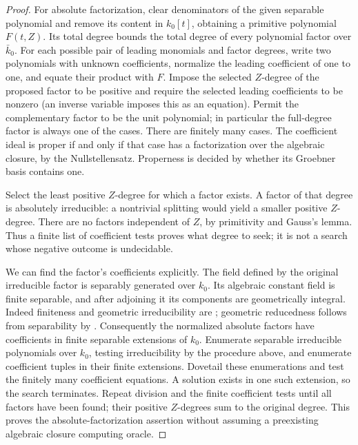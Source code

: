 \begin{proof}
For absolute factorization, clear denominators of the
given separable polynomial and remove its content
in $k_0[t]$, obtaining a primitive polynomial
$F(t,Z)$.  Its total degree bounds the total degree
of every polynomial factor over $\bar k_0$.
For each possible pair of leading monomials and
factor degrees, write two polynomials with unknown
coefficients, normalize the leading coefficient of
one to one, and equate their product with $F$.
Impose the selected $Z$-degree of the proposed factor
to be positive and require the selected leading
coefficients to be nonzero (an inverse variable
imposes this as an equation).  Permit the complementary
factor to be the unit polynomial; in particular the
full-degree factor is always one of the cases.
There are finitely many cases.  The coefficient
ideal is proper if and only if that case has a
factorization over the algebraic closure, by the
Nullstellensatz.  Properness is decided by whether
its Groebner basis contains one.

Select the least positive $Z$-degree for which a
factor exists.  A factor of that degree is absolutely
irreducible: a nontrivial splitting would yield a
smaller positive $Z$-degree.  There are no factors
independent of $Z$, by primitivity and Gauss's lemma.
Thus a finite list of coefficient tests proves what
degree to seek; it is not a search whose negative
outcome is undecidable.

We can find the factor's coefficients explicitly.
The field defined by the original irreducible factor
is separably generated over $k_0$.  Its algebraic
constant field is finite separable, and after adjoining
it its components are geometrically integral.
Indeed finiteness and geometric irreducibility are
\cite[Lemmas~10.47.8 and 10.47.13]{Stacks037P,Stacks037Q};
geometric reducedness follows from separability by
\cite[Lemmas~10.44.2 and 10.44.3]{Stacks030W,Stacks030X}.
Consequently the normalized absolute factors have
coefficients in finite separable extensions of $k_0$.
Enumerate separable irreducible polynomials over
$k_0$, testing irreducibility by the procedure above,
and enumerate coefficient tuples in their finite
extensions.  Dovetail these enumerations and test
the finitely many coefficient equations.  A solution
exists in one such extension, so the search terminates.
Repeat division and the finite coefficient tests
until all factors have been found; their positive
$Z$-degrees sum to the original degree.
This proves the absolute-factorization assertion
without assuming a preexisting algebraic closure
computing oracle.
\end{proof}

